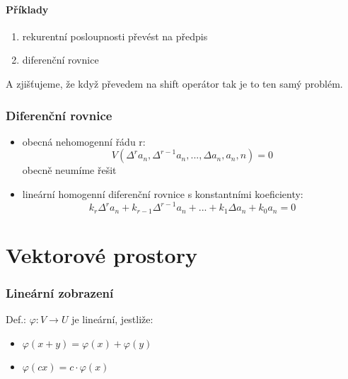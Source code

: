 \documentclass{article}
\begin{document}
\subsection{Příklady}
\begin{enumerate}
  \item rekurentní posloupnosti převést na předpis
  \item diferenční rovnice
\end{enumerate}
A zjišťujeme, že když převedem na shift operátor tak je to ten samý problém.

\section{Diferenční rovnice}
\begin{itemize}
  \item obecná nehomogenní řádu r: $$V(\Delta^r a_n, \Delta^{r-1} a_n,..., \Delta a_n, a_n, n) = 0$$ obecně neumíme řešit
  \item lineární homogenní diferenční rovnice s konstantními koeficienty: $$ k_r \Delta^r a_n + k_{r-1} \Delta^{r-1} a_n + ... + k_1 \Delta a_n + k_0 a_n = 0$$
\end{itemize}

\part{Vektorové prostory}
\section{Lineární zobrazení}
Def.: $\varphi: V \rightarrow U$ je lineární, jestliže:
\begin{itemize}
  \item $\varphi (x+y) = \varphi (x) + \varphi (y)$
  \item $\varphi (cx) = c \cdot \varphi (x)$
\end{itemize}
\end{document}
